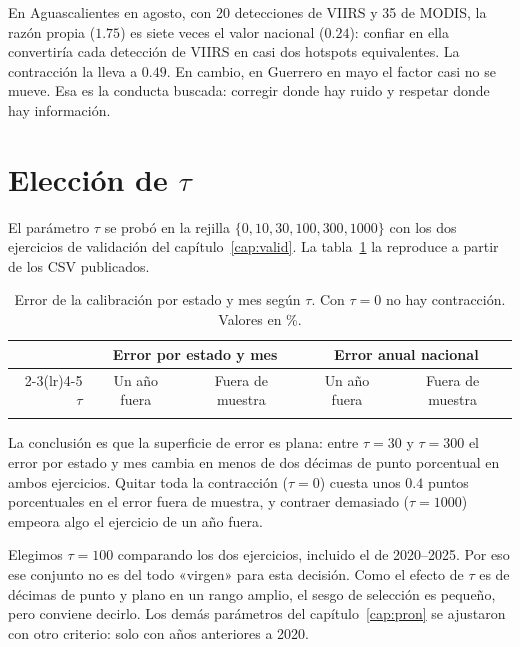 En Aguascalientes en agosto, con 20 detecciones de VIIRS y 35 de MODIS, la razón propia ($1.75$) es siete veces el valor nacional ($0.24$): confiar en ella convertiría cada detección de VIIRS en casi dos hotspots equivalentes. La contracción la lleva a $0.49$. En cambio, en Guerrero en mayo el factor casi no se mueve. Esa es la conducta buscada: corregir donde hay ruido y respetar donde hay información.

\section{Elección de \texorpdfstring{$\tau$}{tau}}\label{sec:tau}

El parámetro $\tau$ se probó en la rejilla $\{0,10,30,100,300,1000\}$ con los dos ejercicios de validación del capítulo~\ref{cap:valid}. La tabla~\ref{tab:tau} la reproduce a partir de los CSV publicados.

\begin{table}[H]
\centering
\caption{Error de la calibración por estado y mes según $\tau$. Con $\tau=0$ no hay contracción. Valores en \%.}\label{tab:tau}
\small
\begin{tabular}{@{}rcccc@{}}
\toprule
 & \multicolumn{2}{c}{Error por estado y mes} & \multicolumn{2}{c}{Error anual nacional}\\
\cmidrule(lr){2-3}\cmidrule(lr){4-5}
$\tau$ & Un año fuera & Fuera de muestra & Un año fuera & Fuera de muestra \\
\midrule

\\
\bottomrule
\end{tabular}
\end{table}

La conclusión es que la superficie de error es plana: entre $\tau=30$ y $\tau=300$ el error por estado y mes cambia en menos de dos décimas de punto porcentual en ambos ejercicios. Quitar toda la contracción ($\tau=0$) cuesta unos $0.4$ puntos porcentuales en el error fuera de muestra, y contraer demasiado ($\tau=1000$) empeora algo el ejercicio de un año fuera.

\begin{cuidado}
Elegimos $\tau=100$ comparando los dos ejercicios, incluido el de 2020--2025. Por eso ese conjunto no es del todo «virgen» para esta decisión. Como el efecto de $\tau$ es de décimas de punto y plano en un rango amplio, el sesgo de selección es pequeño, pero conviene decirlo. Los demás parámetros del capítulo~\ref{cap:pron} se ajustaron con otro criterio: solo con años anteriores a 2020.
\end{cuidado}

